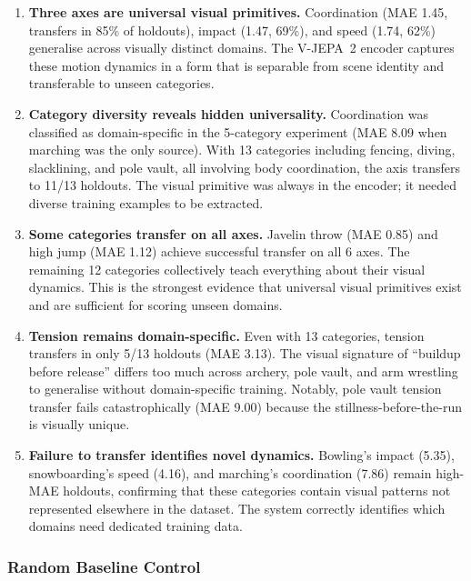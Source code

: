 \documentclass[11pt]{article}
\begin{document}
\begin{enumerate}
    \item \textbf{Three axes are universal visual primitives.} Coordination (MAE 1.45, transfers in 85\% of holdouts), impact (1.47, 69\%), and speed (1.74, 62\%) generalise across visually distinct domains. The V-JEPA~2 encoder captures these motion dynamics in a form that is separable from scene identity and transferable to unseen categories.

    \item \textbf{Category diversity reveals hidden universality.} Coordination was classified as domain-specific in the 5-category experiment (MAE 8.09 when marching was the only source). With 13 categories including fencing, diving, slacklining, and pole vault, all involving body coordination, the axis transfers to 11/13 holdouts. The visual primitive was always in the encoder; it needed diverse training examples to be extracted.

    \item \textbf{Some categories transfer on all axes.} Javelin throw (MAE 0.85) and high jump (MAE 1.12) achieve successful transfer on all 6 axes. The remaining 12 categories collectively teach everything about their visual dynamics. This is the strongest evidence that universal visual primitives exist and are sufficient for scoring unseen domains.

    \item \textbf{Tension remains domain-specific.} Even with 13 categories, tension transfers in only 5/13 holdouts (MAE 3.13). The visual signature of ``buildup before release'' differs too much across archery, pole vault, and arm wrestling to generalise without domain-specific training. Notably, pole vault tension transfer fails catastrophically (MAE 9.00) because the stillness-before-the-run is visually unique.

    \item \textbf{Failure to transfer identifies novel dynamics.} Bowling's impact (5.35), snowboarding's speed (4.16), and marching's coordination (7.86) remain high-MAE holdouts, confirming that these categories contain visual patterns not represented elsewhere in the dataset. The system correctly identifies which domains need dedicated training data.
\end{enumerate}

\subsubsection{Random Baseline Control}
\end{document}
